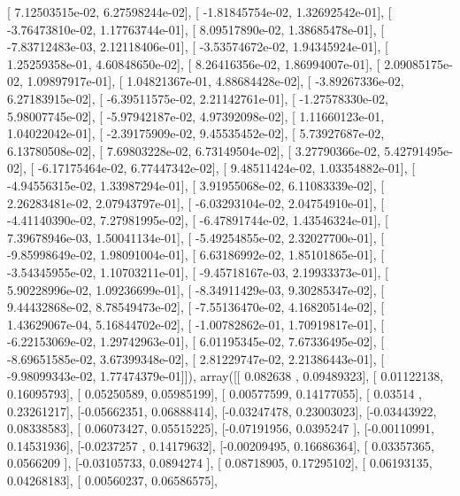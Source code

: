 \documentclass{article}
\begin{document}
       [  7.12503515e-02,   6.27598244e-02],
       [ -1.81845754e-02,   1.32692542e-01],
       [ -3.76473810e-02,   1.17763744e-01],
       [  8.09517890e-02,   1.38685478e-01],
       [ -7.83712483e-03,   2.12118406e-01],
       [ -3.53574672e-02,   1.94345924e-01],
       [  1.25259358e-01,   4.60848650e-02],
       [  8.26416356e-02,   1.86994007e-01],
       [  2.09085175e-02,   1.09897917e-01],
       [  1.04821367e-01,   4.88684428e-02],
       [ -3.89267336e-02,   6.27183915e-02],
       [ -6.39511575e-02,   2.21142761e-01],
       [ -1.27578330e-02,   5.98007745e-02],
       [ -5.97942187e-02,   4.97392098e-02],
       [  1.11660123e-01,   1.04022042e-01],
       [ -2.39175909e-02,   9.45535452e-02],
       [  5.73927687e-02,   6.13780508e-02],
       [  7.69803228e-02,   6.73149504e-02],
       [  3.27790366e-02,   5.42791495e-02],
       [ -6.17175464e-02,   6.77447342e-02],
       [  9.48511424e-02,   1.03354882e-01],
       [ -4.94556315e-02,   1.33987294e-01],
       [  3.91955068e-02,   6.11083339e-02],
       [  2.26283481e-02,   2.07943797e-01],
       [ -6.03293104e-02,   2.04754910e-01],
       [ -4.41140390e-02,   7.27981995e-02],
       [ -6.47891744e-02,   1.43546324e-01],
       [  7.39678946e-03,   1.50041134e-01],
       [ -5.49254855e-02,   2.32027700e-01],
       [ -9.85998649e-02,   1.98091004e-01],
       [  6.63186992e-02,   1.85101865e-01],
       [ -3.54345955e-02,   1.10703211e-01],
       [ -9.45718167e-03,   2.19933373e-01],
       [  5.90228996e-02,   1.09236699e-01],
       [ -8.34911429e-03,   9.30285347e-02],
       [  9.44432868e-02,   8.78549473e-02],
       [ -7.55136470e-02,   4.16820514e-02],
       [  1.43629067e-04,   5.16844702e-02],
       [ -1.00782862e-01,   1.70919817e-01],
       [ -6.22153069e-02,   1.29742963e-01],
       [  6.01195345e-02,   7.67336495e-02],
       [ -8.69651585e-02,   3.67399348e-02],
       [  2.81229747e-02,   2.21386443e-01],
       [ -9.98099343e-02,   1.77474379e-01]]), array([[ 0.082638  ,  0.09489323],
       [ 0.01122138,  0.16095793],
       [ 0.05250589,  0.05985199],
       [ 0.00577599,  0.14177055],
       [ 0.03514   ,  0.23261217],
       [-0.05662351,  0.06888414],
       [-0.03247478,  0.23003023],
       [-0.03443922,  0.08338583],
       [ 0.06073427,  0.05515225],
       [-0.07191956,  0.0395247 ],
       [-0.00110991,  0.14531936],
       [-0.0237257 ,  0.14179632],
       [-0.00209495,  0.16686364],
       [ 0.03357365,  0.0566209 ],
       [-0.03105733,  0.0894274 ],
       [ 0.08718905,  0.17295102],
       [ 0.06193135,  0.04268183],
       [ 0.00560237,  0.06586575],
\end{document}
